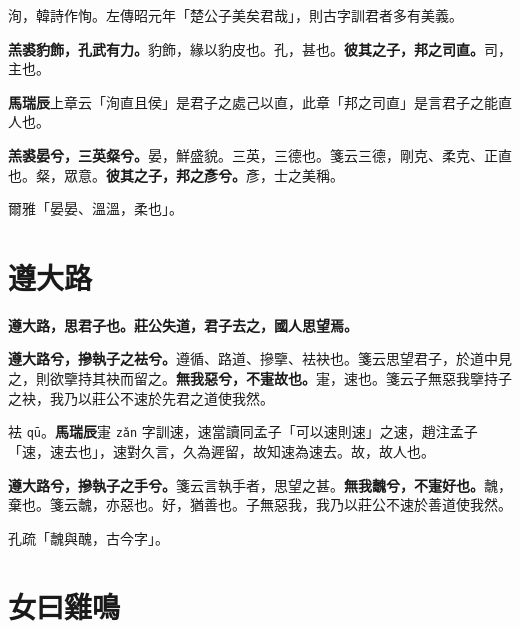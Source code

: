 \begin{quoting}洵，韓詩作恂。左傳昭元年「楚公子美矣君哉」，則古字訓君者多有美義。\end{quoting}

\textbf{羔裘豹飾，孔武有力。}{\footnotesize 豹飾，緣以豹皮也。孔，甚也。}\textbf{彼其之子，邦之司直。}{\footnotesize 司，主也。}

\begin{quoting}\textbf{馬瑞辰}上章云「洵直且侯」是君子之處己以直，此章「邦之司直」是言君子之能直人也。\end{quoting}

\textbf{羔裘晏兮，三英粲兮。}{\footnotesize 晏，鮮盛貌。三英，三德也。箋云三德，剛克、柔克、正直也。粲，眾意。}\textbf{彼其之子，邦之彥兮。}{\footnotesize 彥，士之美稱。}

\begin{quoting}爾雅「晏晏、溫溫，柔也」。\end{quoting}

\section{遵大路}


\textbf{遵大路，思君子也。莊公失道，君子去之，國人思望焉。}

\textbf{遵大路兮，摻執子之袪兮。}{\footnotesize 遵循、路道、摻擥、袪袂也。箋云思望君子，於道中見之，則欲擥持其袂而留之。}\textbf{無我惡兮，不寁故也。}{\footnotesize 寁，速也。箋云子無惡我擥持子之袂，我乃以莊公不速於先君之道使我然。}

\begin{quoting}袪 \texttt{qū}。\textbf{馬瑞辰}寁 \texttt{zǎn} 字訓速，速當讀同孟子「可以速則速」之速，趙注孟子「速，速去也」，速對久言，久為遲留，故知速為速去。故，故人也。\end{quoting}

\textbf{遵大路兮，摻執子之手兮。}{\footnotesize 箋云言執手者，思望之甚。}\textbf{無我魗兮，不寁好也。}{\footnotesize 魗，棄也。箋云魗，亦惡也。好，猶善也。子無惡我，我乃以莊公不速於善道使我然。}

\begin{quoting}孔疏「魗與醜，古今字」。\end{quoting}

\section{女曰雞鳴}

